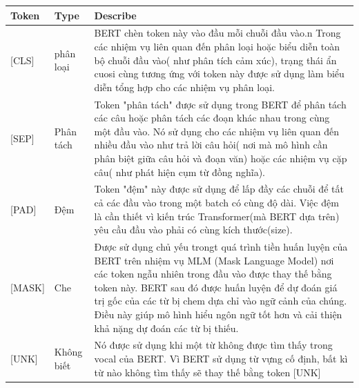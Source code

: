 \documentclass[final,letterpaper,twoside,12pt]{report}
\begin{document}
\begin{tabular}{|p{2cm}|p{4cm}|p{8cm}|}
	\hline
	Token              & Type       & Describe                                                                                                                                                                                                                                                                                                                                                                     \\
	\hline
	\color{blue} [CLS] & phân loại  & BERT chèn token này vào đầu mỗi chuỗi đầu vào.n Trong các nhiệm vụ liên quan đến phân loại hoặc biểu diễn toàn bộ chuỗi đầu vào( như phân tích cảm xúc), trạng thái ẩn cuosi cùng tương ứng với token này được sử dụng làm biểu diễn tổng hợp cho các nhiệm vụ phân loại.                                                                                                    \\
	\hline
	\color{blue} [SEP] & Phân tách  & Token "phân tách" được sử dụng trong BERT để phân tách các câu hoặc phân tách các đoạn khác nhau trong cùng một đầu vào. Nó sử dụng cho các nhiệm vụ liên quan đến nhiều đầu vào như trả lời câu hỏi( nơi mà mô hình cần phân biệt giữa câu hỏi và đoạn văn) hoặc các nhiệm vụ cặp câu( như phát hiện cụm từ đồng nghĩa).                                                    \\
	\hline
	\color{blue} [PAD] & Đệm        & Token "đệm" này được sử dụng để lấp đầy các chuỗi để tất cả các đầu vào trong một batch có cùng độ dài. Việc đệm là cần thiết vì kiến trúc Transformer(mà BERT dựa trên) yêu cầu đầu vào phải có cùng kích thước(size).                                                                                                                                                      \\
	\hline
	\color{blue}[MASK] & Che        & Được sử dụng chủ yếu trongt quá trình tiền huấn luyện của BERT trên nhiệm vụ MLM (Mask Language Model) nơi các token ngẫu nhiên trong đầu vào được thay thế bằng token này. BERT sau đó được huấn luyện để dự đoán giá trị gốc của các từ bị chem dựa chỉ vào ngữ cảnh của chúng. Điều này giúp mô hình hiểu ngôn ngữ tốt hơn và cải thiện khả nặng dự đoán các từ bị thiếu. \\
	\hline
	\color{blue}[UNK]  & Không biết & Nó được sử dụng khi một từ không được tìm thấy trong vocal của BERT. Vì BERT sử dụng từ vựng cố định, bất kì từ nào không tìm thấy sẽ thay thế bằng token [UNK]                                                                                                                                                                                                              \\
	\hline
\end{tabular}
\end{document}
